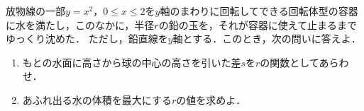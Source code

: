 放物線の一部$y=x^2$，$0\le x\le 2$を$y$軸のまわりに回転してできる回転体型の容器に水を満たし，このなかに，半径$r$の鉛の玉を，それが容器に使えて止まるまでゆっくり沈めた．
ただし，鉛直線を$y$軸とする．このとき，次の問いに答えよ．
\begin{enumerate}
  \item もとの水面に高さから球の中心の高さを引いた差$s$を$r$の関数としてあらわせ．
  \item あふれ出る水の体積を最大にする$r$の値を求めよ．
\end{enumerate}
